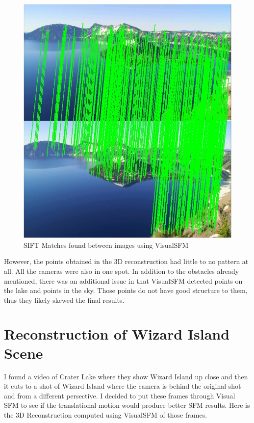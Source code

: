 \documentclass[11pt,psfig]{article}
\begin{document}
\begin{figure}[H]
\centering
\includegraphics[width=\columnwidth]{sfmResults1/shot14_26_siftMatches.jpg}
\caption{SIFT Matches found between images using VisualSFM}
\end{figure}

\newpage

However, the points obtained in the 3D reconstruction had little to no pattern at all. All the cameras were also in one spot. In addition to the obstacles already mentioned, there was an additional issue in that VisualSFM detected points on the lake and points in the sky. Those points do not have good structure to them, thus they likely skewed the final results. 

\newpage

\section{Reconstruction of Wizard Island Scene}

I found a video of Crater Lake where they show Wizard Island up close and then it cuts to a shot of Wizard Island where the camera is behind the original shot and from a different persective. I decided to put these frames through Visual SFM to see if the translational motion would produce better SFM results. Here is the 3D Reconstruction computed using VisualSFM of those frames. 
\end{document}
